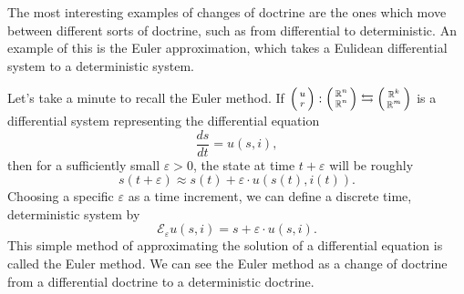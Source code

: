 \documentclass[DynamicalBook]{subfiles}
\begin{document}
The most interesting examples of changes of doctrine are the ones which move
between different sorts of doctrine, such as from differential to deterministic.
An example of this is the Euler approximation, which takes a Eulidean
differential system to a deterministic system.

Let's take a minute to recall the Euler method. If $\lens{u}{r} : \lens{\rr^n}{\rr^n} \fromto \lens{\rr^k}{\rr^m}$
is a differential system representing the differential equation
$$\frac{ds}{dt} = u(s, i),$$
then for a sufficiently small $\varepsilon > 0$, the state at time $t + \varepsilon$
will be roughly
$$s(t + \varepsilon) \approx s(t) + \varepsilon \cdot u(s(t), i(t)).$$
Choosing a specific $\varepsilon$ as a time increment, we can define a discrete
time, deterministic system by
\begin{equation}\label{eqn:euler.method.equation}
\mathcal{E}_{\varepsilon}u(s, i) = s + \varepsilon \cdot u(s, i).
\end{equation}
This simple method of approximating the solution of a differential equation is
called the Euler method. We can see the Euler method as a change of doctrine
from a differential doctrine to a deterministic doctrine.
\end{document}
